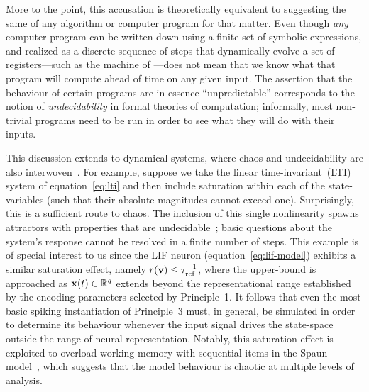 More to the point, this accusation is theoretically equivalent to suggesting the same of any algorithm or computer program for that matter.
Even though \emph{any} computer program can be written down using a finite set of symbolic expressions, and realized as a discrete sequence of steps that dynamically evolve a set of registers---such as the machine of \citet{turing1938computable}---does not mean that we know what that program will compute ahead of time on any given input.
The assertion that the behaviour of certain programs are in essence ``unpredictable'' corresponds to the notion of \emph{undecidability} in formal theories of computation; informally, most non-trivial programs need to be run in order to see what they will do with their inputs.

This discussion extends to dynamical systems, where chaos and undecidability are also interwoven~\citep{moore1991generalized}.
For example, suppose we take the linear time-invariant~(LTI) system of equation~\ref{eq:lti} and then include saturation within each of the state-variables (such that their absolute magnitudes cannot exceed one).
Surprisingly, this is a sufficient route to chaos.
The inclusion of this single nonlinearity spawns attractors with properties that are undecidable~\citep{blondel2001stability}; basic questions about the system's response cannot be resolved in a finite number of steps.
This example is of special interest to us since the LIF neuron (equation~\ref{eq:lif-model}) exhibits a similar saturation effect, namely $r(\mathbf{v}) \le \tau_\text{ref}^{-1}$, where the upper-bound is approached as $\mathbf{x}(t) \in \mathbb{R}^q$ extends beyond the representational range established by the encoding parameters selected by Principle~1.
It follows that even the most basic spiking instantiation of Principle~3 must, in general, be simulated in order to determine its behaviour whenever the input signal drives the state-space outside the range of neural representation.
Notably, this saturation effect is exploited to overload working memory with sequential items in the Spaun model~\citep{eliasmith2012}, which suggests that the model behaviour is chaotic at multiple levels of analysis.

